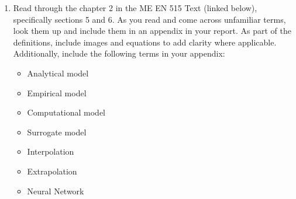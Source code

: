 \documentclass[12pt]{article}
\begin{document}
\begin{enumerate}
	\item Read through the chapter 2 in the ME EN 515 Text (linked below), specifically sections 5 and 6.  As you read and come across unfamiliar terms, look them up and include them in an appendix in your report.  As part of the definitions, include images and equations to add clarity where applicable.  Additionally, include the following terms in your appendix:
	\begin{multicols}{3}
		\begin{itemize}
			\item Analytical model
			\item Empirical model
			\item Computational model
			\item Surrogate model
			\item Interpolation
			\item Extrapolation
			\item Neural Network
		\end{itemize}
	\end{multicols}

\end{enumerate}
\end{document}
